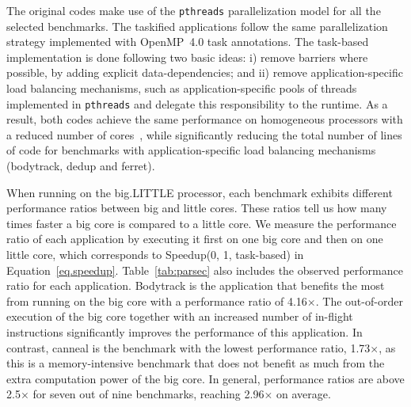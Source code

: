 The original codes make use of the \texttt{pthreads} parallelization model for all the selected benchmarks. The taskified applications follow the same parallelization strategy implemented with OpenMP~4.0 task annotations.
The task-based implementation is done following two basic ideas: i) remove barriers where possible, by adding explicit data-dependencies; and ii) remove application-specific load balancing mechanisms, such as application-specific pools of threads implemented in \texttt{pthreads} and delegate this responsibility to the runtime.
As a result, both codes achieve the same performance on homogeneous processors with a reduced number of cores~\cite{Chasapis:TACO2016}, while significantly reducing the total number of lines of code for benchmarks with application-specific load balancing mechanisms (bodytrack, dedup and ferret).



When running on the big.LITTLE processor, each benchmark exhibits different performance ratios between big and little cores. These ratios tell us how many times faster a big core is compared to a little core. We measure the performance ratio of each application by executing it first on one big core and then on one little core, which corresponds to Speedup(0, 1, task-based) in Equation~\ref{eq.speedup}. 
Table~\ref{tab:parsec} also includes the observed performance ratio for each application. Bodytrack is the application that benefits the most from running on the big core with a performance ratio of 4.16$\times$. The out-of-order execution of the big core together with an increased number of in-flight instructions significantly improves the performance of this application. In contrast, canneal is the benchmark with the lowest performance ratio, 1.73$\times$, as this is a memory-intensive benchmark that does not benefit as much from the extra computation power of the big core. In general, performance ratios are above 2.5$\times$ for seven out of nine benchmarks, reaching 2.96$\times$ on average. 

